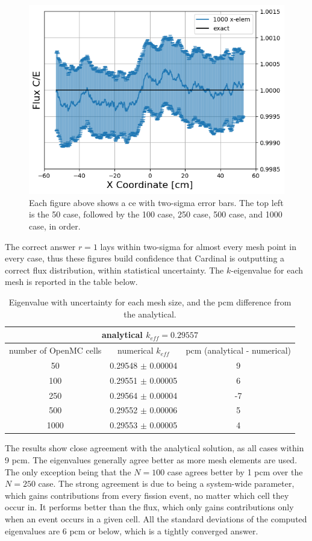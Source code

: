 \documentclass[letterpaper]{mc2023}
\begin{document}
\begin{figure}[H]
\begin{minipage}[b]{0.32\linewidth}
        \includegraphics[width=\linewidth]{figures/1000_flux_CE_error_bars}
    \end{minipage}
    \caption{Each figure above shows a \gls{ce} with two-sigma error bars. The top left is the 50 case, followed by the 100 case, 250 case, 500 case, and 1000 case, in order.}
\end{figure}
The correct answer $r=1$ lays within two-sigma for almost every mesh point in every case, thus these figures build confidence that Cardinal is outputting
a correct flux distribution, within statistical uncertainty. The $k$-eigenvalue for each mesh is reported in the table below.
\begin{table}[H]
    \centering
    \caption{Eigenvalue with uncertainty for each mesh size, and the pcm difference from the analytical.}
    \begin{tabular}{@{}ccc@{}}
        \toprule
        \multicolumn{3}{c}{analytical $k_{eff}=0.29557$} \\
        \midrule
        number of OpenMC cells & numerical $k_{eff}$ & pcm (analytical - numerical)\\
        \midrule
        50 & 0.29548 $\pm$ 0.00004 & 9 \\
        100 & 0.29551 $\pm$ 0.00005 & 6 \\
        250 & 0.29564  $\pm$ 0.00004 &  -7 \\
        500 & 0.29552 $\pm$ 0.00006 & 5 \\
        1000 & 0.29553 $\pm$ 0.00005 & 4 \\
        \bottomrule
    \end{tabular}
    \label{tab:data}
\end{table}
The results show close agreement with the analytical solution, as all cases within 9 pcm. The eigenvalues generally agree better as more mesh elements
are used. The only exception being that the $N=100$ case agrees better by 1 pcm over the $N=250$ case. The strong agreement is due to being a system-wide
parameter, which gains contributions from every fission event, no matter which cell they occur in. It performs better than the flux, which only gains
contributions only when an event occurs in a given cell. All the standard deviations of the computed eigenvalues are 6 pcm or below, which is a
tightly converged answer.
\end{document}

